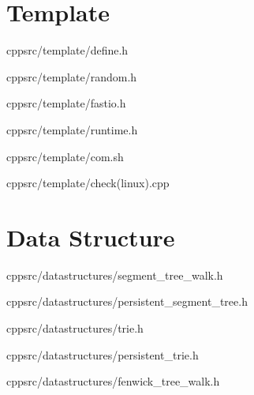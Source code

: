 \documentclass[portrait, 8pt, a4paper, oneside, twocolumn]{extarticle}
\begin{document}
\maketitlepage


\noindent\hrulefill

\section{Template}
    {}
    {}
    {cpp}{src/template/define.h}
    \noindent\hrulefill

    {}
    {}
    {cpp}{src/template/random.h}
    \noindent\hrulefill

    {}
    {}
    {cpp}{src/template/fastio.h}
    \noindent\hrulefill

    {}
    {}
    {cpp}{src/template/runtime.h}
    \noindent\hrulefill

    {}
    {}
    {cpp}{src/template/com.sh}
    \noindent\hrulefill

    {}
    {}
    {cpp}{src/template/check(linux).cpp}
    \noindent\hrulefill



\section{Data Structure}

    {}
    {}
    {cpp}{src/datastructures/segment_tree_walk.h}
    \noindent\hrulefill

    {}
    {}
    {cpp}{src/datastructures/persistent_segment_tree.h}
    \noindent\hrulefill

    {}
    {}
    {cpp}{src/datastructures/trie.h}
    \noindent\hrulefill

    {}
    {}
    {cpp}{src/datastructures/persistent_trie.h}
    \noindent\hrulefill

    {}
    {}
    {cpp}{src/datastructures/fenwick_tree_walk.h}
    \noindent\hrulefill
\end{document}
